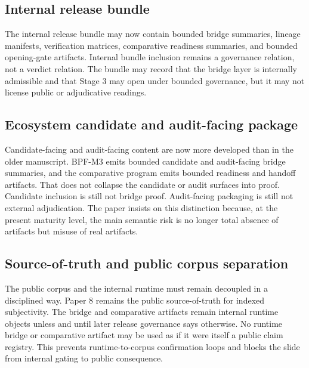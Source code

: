 \documentclass[11pt,a4paper]{article}
\theoremstyle{definition}
\begin{document}
\subsection{Internal release bundle}
The internal release bundle may now contain bounded bridge summaries, lineage manifests, verification matrices, comparative readiness summaries, and bounded opening-gate artifacts. Internal bundle inclusion remains a governance relation, not a verdict relation. The bundle may record that the bridge layer is internally admissible and that Stage 3 may open under bounded governance, but it may not license public or adjudicative readings.

\subsection{Ecosystem candidate and audit-facing package}
Candidate-facing and audit-facing content are now more developed than in the older manuscript. BPF-M3 emits bounded candidate and audit-facing bridge summaries, and the comparative program emits bounded readiness and handoff artifacts. That does not collapse the candidate or audit surfaces into proof. Candidate inclusion is still not bridge proof. Audit-facing packaging is still not external adjudication. The paper insists on this distinction because, at the present maturity level, the main semantic risk is no longer total absence of artifacts but misuse of real artifacts.

\subsection{Source-of-truth and public corpus separation}
The public corpus and the internal runtime must remain decoupled in a disciplined way. Paper 8 remains the public source-of-truth for indexed subjectivity. The bridge and comparative artifacts remain internal runtime objects unless and until later release governance says otherwise. No runtime bridge or comparative artifact may be used as if it were itself a public claim registry. This prevents runtime-to-corpus confirmation loops and blocks the slide from internal gating to public consequence.
\end{document}
